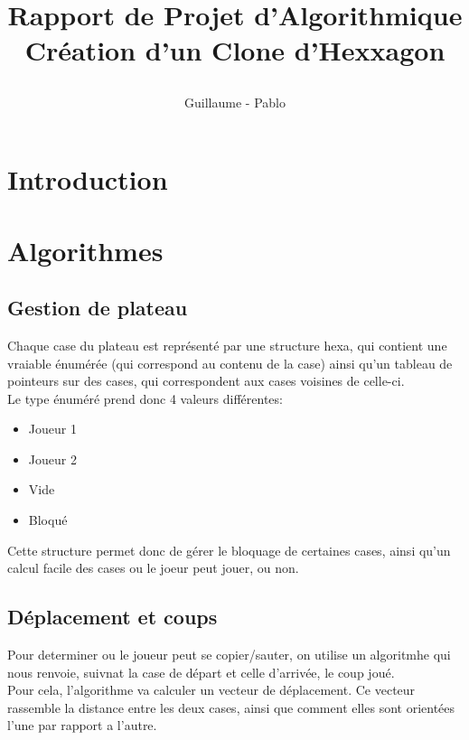 \documentclass{report}
\begin{document}
\title{%
    \begin{minipage}\linewidth
        \centering
        Rapport de Projet d'Algorithmique
        \vskip 3pt
        \large Création d'un Clone d'Hexxagon
    \end{minipage}
}
\author{Guillaume  - Pablo }
\maketitle

\section{Introduction}
	
\section{Algorithmes}
	\subsection{Gestion de plateau}
		Chaque case du plateau est représenté par une structure hexa, qui contient une vraiable énumérée (qui correspond au contenu de la case) ainsi qu'un tableau de pointeurs sur des cases, qui correspondent aux cases voisines de celle-ci.\\
		Le type énuméré prend donc 4 valeurs différentes: \begin{itemize}\item Joueur 1
								  \item Joueur 2
								  \item Vide
								  \item Bloqué\end{itemize}
		
		Cette structure permet donc de gérer le bloquage de certaines cases, ainsi qu'un calcul facile des cases ou le joeur peut jouer, ou non. 
	\subsection{Déplacement et coups}
	Pour determiner ou le joueur peut se copier/sauter, on utilise un algoritmhe qui nous renvoie, suivnat la case de départ et celle d'arrivée, le coup joué.\\
	
	Pour cela, l'algorithme va calculer un vecteur de déplacement.  Ce vecteur rassemble la distance entre les deux cases, ainsi que comment elles sont orientées l'une par rapport a l'autre.\\
	
\end{document}
